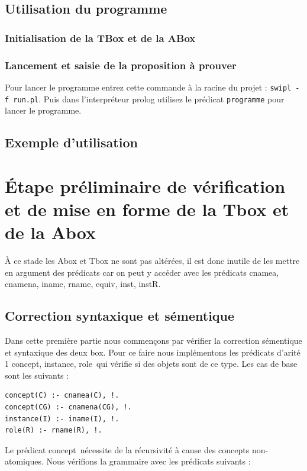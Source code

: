 \documentclass[12pt]{article}
\begin{document}
\subsection{Utilisation du programme}
\subsubsection{Initialisation de la TBox et de la ABox}

\subsubsection{Lancement et saisie de la proposition à prouver}
Pour lancer le programme entrez cette commande à la racine du projet : \verb|swipl -f run.pl|. Puis dans l'interpréteur prolog utilisez le prédicat \verb|programme| pour lancer le programme.


\subsection{Exemple d'utilisation}


\section{\'Etape préliminaire de vérification et de mise en forme de la Tbox et de la Abox}
\`A ce stade les Abox et Tbox ne sont pas altérées, il est donc inutile de les mettre en argument des prédicats car on peut y accéder avec les prédicats \color{blue}cnamea, cnamena, iname, rname, equiv, inst, instR\color{black}.
\subsection{Correction syntaxique et sémentique}
Dans cette première partie nous commençons par vérifier la correction sémentique et syntaxique des deux box. Pour ce faire nous implémentons les prédicats d'arité 1 \color{blue}concept, instance, role\color{black}\ qui vérifie si des objets sont de ce type. Les cas de base sont les suivants :

\begin{verbatim}
concept(C) :- cnamea(C), !.
concept(CG) :- cnamena(CG), !. 
instance(I) :- iname(I), !.
role(R) :- rname(R), !. 
\end{verbatim}

Le prédicat \color{blue}concept\color{black}\ nécessite de la récursivité à cause des concepts non-atomiques. Nous vérifions la grammaire avec les prédicats suivants :
\end{document}
